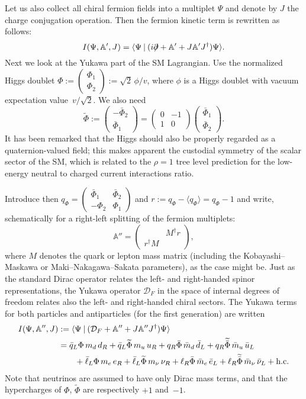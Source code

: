 \documentclass[a4paper,12pt]{article}
\renewcommand{\AA}{\mathbb{A}}      %
\newcommand{\D}{\mathcal{D}}        %
\newcommand{\delslash}{\partial\mkern-9mu/} %
\newcommand{\Onda}[1]{\widetilde{#1}} %
\newcommand{\stroke}{\mathbin\vert} %
\newcommand{\1}{\mathbf{1}}         %
\newcommand{\7}{\dagger}            %
\newcommand{\8}{\bullet}            %
\renewcommand{\.}{\cdot}            %
\renewcommand{\:}{\colon}           %
\def\<#1,#2>{\langle#1\stroke#2\rangle} %
\begin{document}
Let us also collect all chiral fermion fields into a multiplet $\Psi$
and denote by $J$ the charge conjugation operation. Then the fermion 
kinetic term is rewritten as follows:
\begin{equation}
I(\Psi,\AA',J) = \<\Psi, (i \delslash + \AA' + J\AA' J^\7) \Psi>.
\label{eq:action1}
\end{equation}
Next we look at the Yukawa part of the SM Lagrangian. Use the
normalized Higgs doublet
$\Phi := \begin{pmatrix} \Phi_1\\ \Phi_2\end{pmatrix}
:= \sqrt2\,\phi/v$, where $\phi$ is a Higgs doublet with vacuum
expectation value~$v/\sqrt2$. We also need
$$
\Onda\Phi := \begin{pmatrix} -\bar\Phi_2 \\ \bar\Phi_1 \end{pmatrix}
= \begin{pmatrix} 0 &-1\\ 1 & 0 \end{pmatrix}
\begin{pmatrix} \bar\Phi_1 \\ \bar\Phi_2 \end{pmatrix}.
$$
It has been remarked that the Higgs should also be properly regarded
as a quaternion-valued field; this makes apparent the custodial
symmetry of the scalar sector of the SM, which is related to the
$\rho = 1$ tree level prediction for the low-energy neutral to charged
current interactions ratio.

Introduce then $q_\Phi = \begin{pmatrix} \bar\Phi_1 & \bar\Phi_2 \\
- \Phi_2 & \Phi_1 \end{pmatrix}$ and
$r := q_\Phi - \langle q_\Phi \rangle = q_\Phi - 1$ and write,
schematically for a right-left splitting of the fermion multiplets:
$$
\AA'' = \begin{pmatrix} & M^\7 r \\ r^\7 M & \end{pmatrix},
$$
where $M$ denotes the quark or lepton mass matrix (including the
Kobayashi--Maskawa or Maki--Nakagawa--Sakata parameters), as the case
might be. Just as the standard Dirac operator relates the left- and
right-handed spinor representations, the Yukawa operator $\D_F$ in the
space of internal degrees of freedom relates also the left- and
right-handed chiral sectors. The Yukawa terms for both particles and
antiparticles (for the first generation) are written
\begin{align*}
I(\Psi,\AA'',J) &:= \<\Psi, (\D_F + \AA'' + J\AA''J^\7) \Psi>
\\
&= \bar q_L \Phi\,m_d\,d_R + \bar q_L \Onda\Phi\,m_u\,u_R
+ q_R \bar \Phi\,\bar m_d\, \bar d_L
+ q_R \Onda{\bar\Phi}\,\bar m_u\, \bar u_L
\\
&\qquad
+ \bar\ell_L \Phi\,m_e\,e_R
+ \bar\ell_L \Onda\Phi\,m_\nu\,\nu_R
+ \ell_R \bar\Phi\, \bar m_e\, \bar e_L 
+ \ell_R  \Onda{\bar\Phi}\,\bar m_\nu\, \bar \nu_L
+ {\rm h.c.}
\end{align*}
Note that neutrinos are assumed to have only Dirac mass terms, and
that the hypercharges of $\Phi$, $\Onda\Phi$ are respectively $+1$
and~$-1$.
\end{document}
